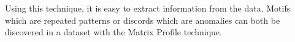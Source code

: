 Using this technique, it is easy to extract information from the data. Motifs which are repeated patterns or discords which are anomalies can both be discovered in a dataset with the Matrix Profile technique. 









